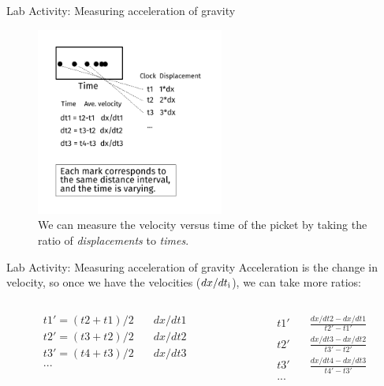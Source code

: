 \documentclass{beamer}
\begin{document}
\begin{frame}{Lab Activity: Measuring acceleration of gravity}
\small
\begin{figure}
\centering
\includegraphics[width=0.55\textwidth]{figures/PicketG2.pdf}
\caption{\label{fig:picket2} We can measure the velocity versus time of the picket by taking the ratio of \textit{displacements} to \textit{times}.}
\end{figure}
\end{frame}

\begin{frame}{Lab Activity: Measuring acceleration of gravity}
\small
Acceleration is the change in velocity, so once we have the velocities ($dx/dt_{\rm i}$), we can take more ratios:
\begin{columns}[T]
\begin{column}{0.5\textwidth}
\begin{align}
t1' = (t2+t1)/2 & \quad dx/dt1 \\
t2' = (t3+t2)/2 & \quad dx/dt2 \\
t3' = (t4+t3)/2  & \quad dx/dt3 \\
...
\end{align}
\end{column}
\begin{column}{0.5\textwidth}
\begin{align}
t1' & \quad \frac{dx/dt2-dx/dt1}{t2'-t1'} \\
t2' & \quad \frac{dx/dt3-dx/dt2}{t3'-t2'}  \\
t3' & \quad \frac{dx/dt4-dx/dt3}{t4'-t3'}  \\
...
\end{align}
\end{column}
\end{columns}
\end{frame}
\end{document}
